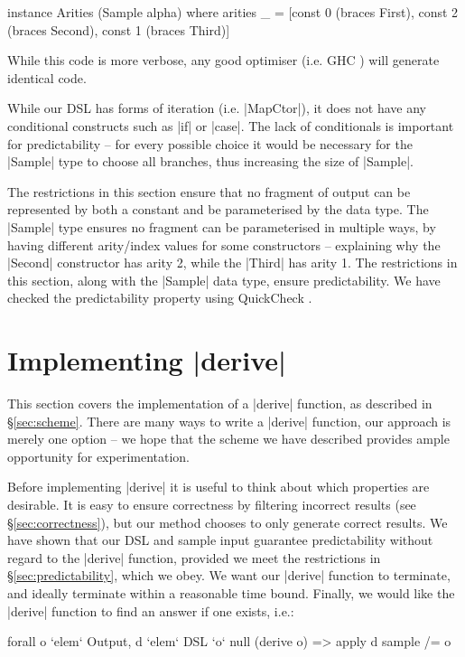 \documentclass{llncs}
\begin{document}
\begin{code}
instance Arities (Sample alpha) where
    arities _ = [const 0 (braces First), const 2 (braces Second), const 1 (braces Third)]
\end{code}

While this code is more verbose, any good optimiser (i.e. GHC \cite{ghc6_10}) will generate identical code.

While our DSL has forms of iteration (i.e. |MapCtor|), it does not have any conditional constructs such as |if| or |case|. The lack of conditionals is important for predictability -- for every possible choice it would be necessary for the |Sample| type to choose all branches, thus increasing the size of |Sample|.

The restrictions in this section ensure that no fragment of output can be represented by both a constant and be parameterised by the data type. The |Sample| type ensures no fragment can be parameterised in multiple ways, by having different arity/index values for some constructors -- explaining why the |Second| constructor has arity 2, while the |Third| has arity 1. The restrictions in this section, along with the |Sample| data type, ensure predictability. We have checked the predictability property using QuickCheck \cite{quickcheck}.

\section{Implementing |derive|}
\label{sec:guess}

This section covers the implementation of a |derive| function, as described in \S\ref{sec:scheme}. There are many ways to write a |derive| function, our approach is merely one option -- we hope that the scheme we have described provides ample opportunity for experimentation.

Before implementing |derive| it is useful to think about which properties are desirable. It is easy to ensure correctness by filtering incorrect results (see \S\ref{sec:correctness}), but our method chooses to only generate correct results. We have shown that our DSL and sample input guarantee predictability without regard to the |derive| function, provided we meet the restrictions in \S\ref{sec:predictability}, which we obey. We want our |derive| function to terminate, and ideally terminate within a reasonable time bound. Finally, we would like the |derive| function to find an answer if one exists, i.e.:

\ignore\begin{code}
forall o `elem` Output, d `elem` DSL `o` null (derive o) => apply d sample /= o
\end{code}
\end{document}
